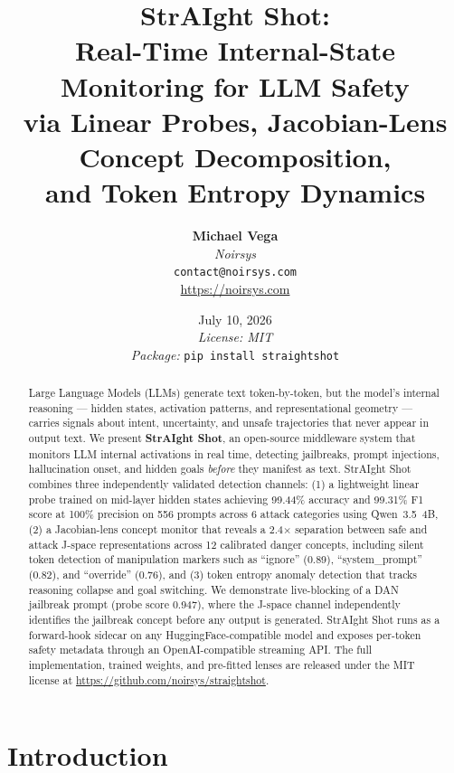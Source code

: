 \documentclass[11pt]{article}
\title{
    {\LARGE StrAIght Shot:}\\[6pt]
    {\large Real-Time Internal-State Monitoring for LLM Safety}\\[10pt]
    {\normalsize via Linear Probes, Jacobian-Lens Concept Decomposition,\\
    and Token Entropy Dynamics}\\[18pt]
}
\author{%
    \textbf{Michael Vega}\\[4pt]
    \small\textit{Noirsys}\\[2pt]
    \small\texttt{contact@noirsys.com}\\[2pt]
    \small\url{https://noirsys.com}
}
\date{%
    \small July 10, 2026\\[6pt]
    \small\textit{License: MIT}\\[2pt]
    \small\textit{Package:} \texttt{pip install straightshot}
}
\begin{document}
\maketitle

\begin{abstract}
\noindent
Large Language Models (LLMs) generate text token-by-token, but the model's internal reasoning — hidden states, activation patterns, and representational geometry — carries signals about intent, uncertainty, and unsafe trajectories that never appear in output text. We present \textbf{StrAIght Shot}, an open-source middleware system that monitors LLM internal activations in real time, detecting jailbreaks, prompt injections, hallucination onset, and hidden goals \textit{before} they manifest as text. StrAIght Shot combines three independently validated detection channels: (1) a lightweight linear probe trained on mid-layer hidden states achieving 99.44\% accuracy and 99.31\% F1 score at 100\% precision on 556 prompts across 6 attack categories using Qwen~3.5~4B, (2) a Jacobian-lens concept monitor that reveals a 2.4$\times$ separation between safe and attack J-space representations across 12 calibrated danger concepts, including silent token detection of manipulation markers such as ``ignore'' (0.89), ``system\_prompt'' (0.82), and ``override'' (0.76), and (3) token entropy anomaly detection that tracks reasoning collapse and goal switching. We demonstrate live-blocking of a DAN jailbreak prompt (probe score 0.947), where the J-space channel independently identifies the jailbreak concept before any output is generated. StrAIght Shot runs as a forward-hook sidecar on any HuggingFace-compatible model and exposes per-token safety metadata through an OpenAI-compatible streaming API. The full implementation, trained weights, and pre-fitted lenses are released under the MIT license at \url{https://github.com/noirsys/straightshot}.
\end{abstract}

\section{Introduction}
\label{sec:introduction}
\end{document}
